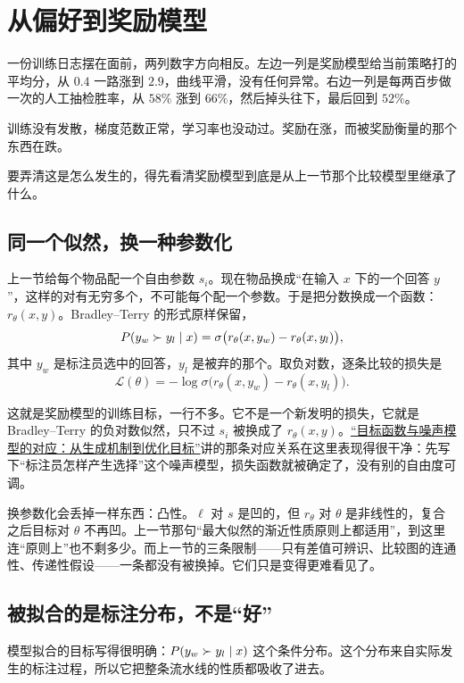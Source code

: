 \section{从偏好到奖励模型}
\label{sec:17-Constrained-Guarantees/05-Learning-from-Comparisons/02}

一份训练日志摆在面前，两列数字方向相反。左边一列是奖励模型给当前策略打的平均分，从 \(0.4\) 一路涨到 \(2.9\)，曲线平滑，没有任何异常。右边一列是每两百步做一次的人工抽检胜率，从 \(58\%\) 涨到 \(66\%\)，然后掉头往下，最后回到 \(52\%\)。

训练没有发散，梯度范数正常，学习率也没动过。奖励在涨，而被奖励衡量的那个东西在跌。

要弄清这是怎么发生的，得先看清奖励模型到底是从上一节那个比较模型里继承了什么。

\subsection{同一个似然，换一种参数化}

上一节给每个物品配一个自由参数 \(s_i\)。现在物品换成``在输入 \(x\) 下的一个回答 \(y\)''，这样的对有无穷多个，不可能每个配一个参数。于是把分数换成一个函数：\(r_\theta(x,y)\)。Bradley--Terry 的形式原样保留，
\[
P(y_w\succ y_l\mid x)=\sigma\bigl(r_\theta(x,y_w)-r_\theta(x,y_l)\bigr),
\]
其中 \(y_w\) 是标注员选中的回答，\(y_l\) 是被弃的那个。取负对数，逐条比较的损失是
\[
\mathcal{L}(\theta)=-\log\sigma\bigl(r_\theta(x,y_w)-r_\theta(x,y_l)\bigr).
\]

这就是奖励模型的训练目标，一行不多。它不是一个新发明的损失，它就是 Bradley--Terry 的负对数似然，只不过 \(s_i\) 被换成了 \(r_\theta(x,y)\)。\hyperref[sec:13-Machine-Learning/01-Learning-Problems-and-Evaluation/03]{``目标函数与噪声模型的对应：从生成机制到优化目标''}讲的那条对应关系在这里表现得很干净：先写下``标注员怎样产生选择''这个噪声模型，损失函数就被确定了，没有别的自由度可调。

换参数化会丢掉一样东西：凸性。\(\ell\) 对 \(s\) 是凹的，但 \(r_\theta\) 对 \(\theta\) 是非线性的，复合之后目标对 \(\theta\) 不再凹。上一节那句``最大似然的渐近性质原则上都适用''，到这里连``原则上''也不剩多少。而上一节的三条限制——只有差值可辨识、比较图的连通性、传递性假设——一条都没有被换掉。它们只是变得更难看见了。

\subsection{被拟合的是标注分布，不是``好''}

模型拟合的目标写得很明确：\(P(y_w\succ y_l\mid x)\) 这个条件分布。这个分布来自实际发生的标注过程，所以它把整条流水线的性质都吸收了进去。

